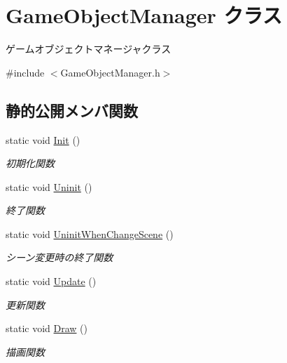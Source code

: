 \hypertarget{class_game_object_manager}{}\section{Game\+Object\+Manager クラス}
\label{class_game_object_manager}


ゲームオブジェクトマネージャクラス  




{\ttfamily \#include $<$Game\+Object\+Manager.\+h$>$}

\subsection*{静的公開メンバ関数}
\begin{DoxyCompactItemize}
\item 
static void \mbox{\hyperlink{class_game_object_manager_abda84aa3b4c79090c43243f93b5a9c46}{Init}} ()
\begin{DoxyCompactList}\small\item\em 初期化関数 \end{DoxyCompactList}\item 
static void \mbox{\hyperlink{class_game_object_manager_a4d2cb0e07fddeea160e64f6e1d2a326a}{Uninit}} ()
\begin{DoxyCompactList}\small\item\em 終了関数 \end{DoxyCompactList}\item 
static void \mbox{\hyperlink{class_game_object_manager_ad962739b2c2f54d4160c3513132930da}{Uninit\+When\+Change\+Scene}} ()
\begin{DoxyCompactList}\small\item\em シーン変更時の終了関数 \end{DoxyCompactList}\item 
static void \mbox{\hyperlink{class_game_object_manager_a6f053b1c655de6ca1c9a8fa9b6e118ae}{Update}} ()
\begin{DoxyCompactList}\small\item\em 更新関数 \end{DoxyCompactList}\item 
static void \mbox{\hyperlink{class_game_object_manager_a0549bd4b6575ee28803c0ff8fd2be2ee}{Draw}} ()
\begin{DoxyCompactList}\small\item\em 描画関数 \end{DoxyCompactList}\item 

\end{DoxyCompactItemize}
